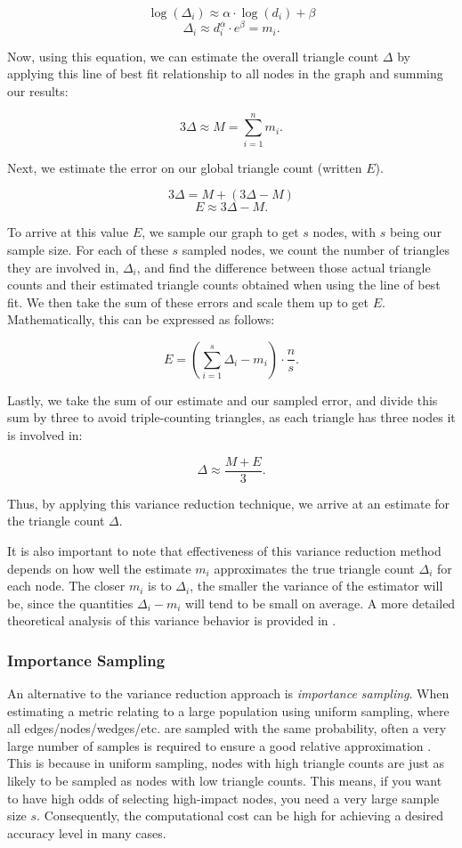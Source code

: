 \documentclass[11pt, margin=1in]{article}
\begin{document}
\[
\log(\Delta_i) \approx \alpha \cdot \log(d_i) + \beta
\]
\[
\Delta_i \approx d_i^\alpha \cdot e^\beta = m_i.
\]

Now, using this equation, we can estimate the overall triangle count $\Delta$ by applying this line of best fit relationship to all nodes in the graph and summing our results:

\[
3\Delta \approx M = \sum_{i = 1}^{n} m_i.
\]

Next, we estimate the error on our global triangle count (written $E$).

\[
3\Delta = M + (3\Delta - M)
\]
\[
E \approx 3\Delta - M.
\]

To arrive at this value $E$, we sample our graph to get $s$ nodes, with $s$ being our sample size.
For each of these $s$ sampled nodes, we count the number of triangles they are involved in, $\Delta_i$, and find the difference between those actual triangle counts and their estimated triangle counts obtained when using the line of best fit.
We then take the sum of these errors and scale them up to get $E$.
Mathematically, this can be expressed as follows:

\[
E = \left( \sum_{i = 1}^{s} \Delta_i - m_i \right) \cdot \frac{n}{s}.
\]

Lastly, we take the sum of our estimate and our sampled error, and divide this sum by three to avoid triple-counting triangles, as each triangle has three nodes it is involved in:

\[
\Delta \approx \frac{M + E}{3}.
\]

Thus, by applying this variance reduction technique, we arrive at an estimate for the triangle count $\Delta$.

It is also important to note that effectiveness of this variance reduction method depends on how well the estimate $m_i$ approximates the true triangle count $\Delta_i$ for each node.
The closer $m_i$ is to $\Delta_i$, the smaller the variance of the estimator will be, since the quantities $\Delta_i - m_i$ will tend to be small on average.
A more detailed theoretical analysis of this variance behavior is provided in .

\subsubsection{Importance Sampling}
\label{sec:importance-sampling-background}

An alternative to the variance reduction approach is \emph{importance sampling}.
When estimating a metric relating to a large population using uniform sampling, where all edges/nodes/wedges/etc. are sampled with the same probability, often a very large number of samples is required to ensure a good relative approximation \cite{lovasz_large_2012}.
This is because in uniform sampling, nodes with high triangle counts are just as likely to be sampled as nodes with low triangle counts.
This means, if you want to have high odds of selecting high-impact nodes, you need a very large sample size $s$.
Consequently, the computational cost can be high for achieving a desired accuracy level in many cases.
\end{document}
